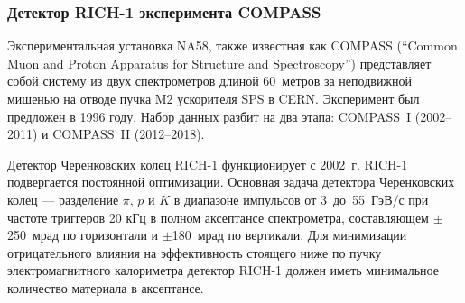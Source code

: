 \subsubsection{Детектор \mbox{RICH-1} эксперимента COMPASS}\label{sec:CompassRich1}



Экспериментальная установка NA58, также известная как COMPASS (``Common Muon and Proton Apparatus for Structure and Spectroscopy'') представляет собой систему из двух спектрометров длиной 60~метров за неподвижной мишенью на отводе пучка M2 ускорителя SPS в CERN. Эксперимент был предложен в 1996 году. Набор данных разбит на два этапа: \mbox{COMPASS I} (2002--2011) и \mbox{COMPASS II} (2012--2018).




Детектор Черенковских колец \mbox{RICH-1} функционирует с 2002~г. \mbox{RICH-1} подвергается постоянной оптимизации.
Основная задача детектора Черенковских колец --- разделение $\pi$, $p$ и $K$ в диапазоне импульсов от 3~до~55~ГэВ/с при частоте триггеров 20 кГц в полном аксептансе спектрометра, составляющем $\pm$250~мрад по горизонтали и $\pm$180~мрад по вертикали. Для минимизации отрицательного влияния на эффективность стоящего ниже по пучку электромагнитного калориметра детектор \mbox{RICH-1} должен иметь минимальное количество материала в аксептансе.

